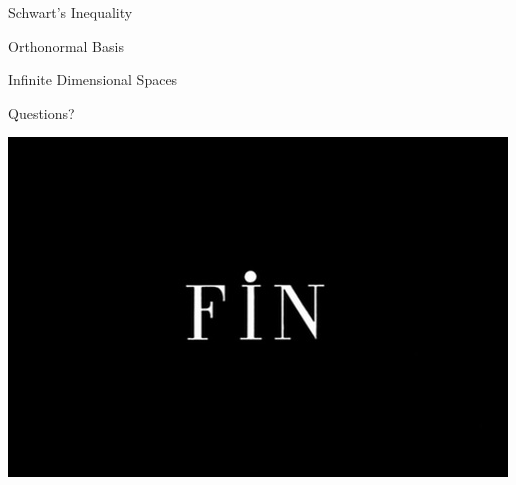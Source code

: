 \documentclass{beamer}
\begin{document}
\begin{frame}{Schwart's Inequality}
\end{frame}

\begin{frame}{Orthonormal Basis}
\end{frame}

\begin{frame}{Infinite Dimensional Spaces}
\end{frame}

\begin{frame}{Questions?}
	\begin{center}
		\includegraphics[width=.7\textwidth]{images/fin.png}
	\end{center}
\end{frame}
\end{document}
